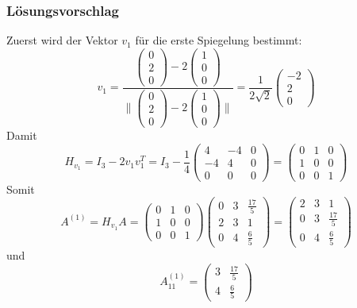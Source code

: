 \documentclass[a4paper,11pt]{scrartcl}
\begin{document}
\subsubsection*{Lösungsvorschlag}
Zuerst wird der Vektor $v_1$ für die erste Spiegelung bestimmt:
$$
v_1=\frac{\begin{pmatrix}0\\2\\0 \end{pmatrix}-2\begin{pmatrix}1\\0\\0\end{pmatrix}}{\|\begin{pmatrix}0\\2\\0 \end{pmatrix}-2\begin{pmatrix}1\\0\\0 \end{pmatrix}\|} =\frac{1}{2\sqrt{2}}\begin{pmatrix}-2\\2\\0 \end{pmatrix}
$$
Damit 
$$
H_{v_1}=I_3-2v_1v_1^T=I_3-\frac{1}{4}\begin{pmatrix} 4 & -4 & 0 \\ -4 & 4 & 0 \\ 0 &0 &0 \end{pmatrix}=\begin{pmatrix} 0&1&0\\1&0&0\\0&0&1\end{pmatrix}
$$
Somit
$$
A^{(1)}=H_{v_1}A=\begin{pmatrix} 0&1&0\\1&0&0\\0&0&1\end{pmatrix}\begin{pmatrix}0&3&\frac{17}{5}\\ 2&3&1\\0&4&\frac{6}{5}\end{pmatrix}=\begin{pmatrix}2 & 3 & 1 \\ 0 & 3 & \frac{17}{5} \\ 0 & 4 & \frac{6}{5}\end{pmatrix}
$$
und 
$$
A^{(1)}_{11}=\begin{pmatrix} 3 & \frac{17}{5} \\ 4 & \frac{6}{5} \end{pmatrix}
$$
\end{document}
